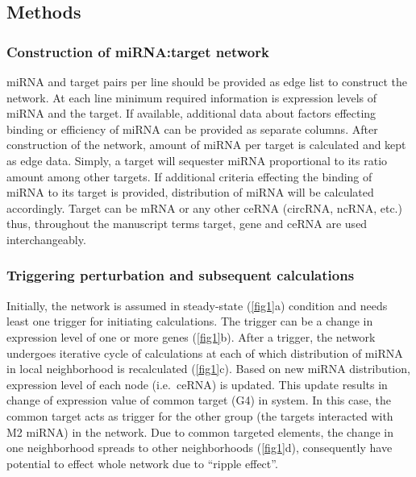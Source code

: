 \documentclass[a4,center,fleqn]{NAR}
\begin{document}
\subsection{Methods}

\hypertarget{construction-of-mirnatarget-network}{%
\subsubsection{Construction of miRNA:target
network}\label{construction-of-mirnatarget-network}}

miRNA and target pairs per line should be provided as edge list to
construct the network. At each line minimum required information is
expression levels of miRNA and the target. If available, additional data
about factors effecting binding or efficiency of miRNA can be provided
as separate columns. After construction of the network, amount of miRNA
per target is calculated and kept as edge data. Simply, a target will
sequester miRNA proportional to its ratio amount among other targets. If
additional criteria effecting the binding of miRNA to its target is
provided, distribution of miRNA will be calculated accordingly. Target
can be mRNA or any other ceRNA (circRNA, ncRNA, etc.) thus, throughout
the manuscript terms target, gene and ceRNA are used interchangeably.

\hypertarget{triggering-perturbation-and-subsequent-calculations}{%
\subsubsection{Triggering perturbation and subsequent
calculations}\label{triggering-perturbation-and-subsequent-calculations}}

Initially, the network is assumed in steady-state (\autoref{fig1}a)
condition and needs least one trigger for initiating calculations. The
trigger can be a change in expression level of one or more genes
(\autoref{fig1}b). After a trigger, the network undergoes iterative
cycle of calculations at each of which distribution of miRNA in local
neighborhood is recalculated (\autoref{fig1}c). Based on new miRNA
distribution, expression level of each node (i.e.~ceRNA) is updated.
This update results in change of expression value of common target (G4)
in system. In this case, the common target acts as trigger for the other
group (the targets interacted with M2 miRNA) in the network. Due to
common targeted elements, the change in one neighborhood spreads to
other neighborhoods (\autoref{fig1}d), consequently have potential to
effect whole network due to ``ripple effect''.
\end{document}
